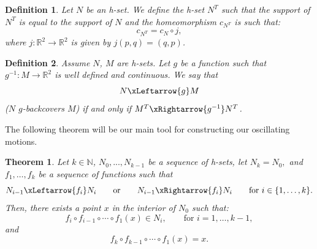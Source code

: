 \documentclass[1p]{article}
\newtheorem{definition}{Definition}
\newtheorem{theorem}{Theorem}
\begin{document}
\begin{definition}\label{def:NT}
    Let $N$ be an h-set. We define the h-set $N^T$ such that the support of $N^T$ is equal to the support of $N$ and  the homeomorphism $c_{N^T}$ is such that:
    \[
        c_{N^T} = c_N \circ j,
    \]
    where $j : \mathbb{R}^2 \to \mathbb{R}^2$ is given by $j(p,q) = (q,p)$.
\end{definition}

\begin{definition}\label{def:back-covering-relation}
    Assume $N$, $M$ are h-sets. Let $g$ be a function such that $g^{-1} : M \to \mathbb{R}^2$ is well defined and continuous. We say that
    \[
        N \xLeftarrow{g} M
    \]
    ($N$ $g$-backcovers $M$) if and only if $M^T \xRightarrow{g^{-1}} N^T$.
\end{definition}

The following theorem will be our main tool for constructing our oscillating motions.
\begin{theorem}
    \label{thm:generic_covering_relations}
    \cite{ZGLICZYNSKI200432} Let $k \in \mathbb{N}$, $N_0, ..., N_{k-1}$ be a sequence of h-sets, let $N_k=N_0,$ and $f_{1}, \dots, f_{k}$ be a sequence of functions such that
    \[
    	N_{i-1} \xLeftarrow{f_i} N_{i} \qquad \mbox{or} \qquad N_{i-1} \xRightarrow{f_i} N_{i} \qquad \mbox{for }i\in\{1,\ldots,k\}.
    \]
    Then, there exists a point $x$ in the interior of $N_0$ such that:
    \[
        f_{i}\circ f_{i-1}\circ\cdots\circ f_{1}(x) \in N_i, \qquad \mbox{for }i=1,\ldots,k-1,
    \]
    and
    \[
        f_{k}\circ f_{k-1}\circ \cdots \circ f_{1}(x)=x.
    \]
\end{theorem}
\end{document}
